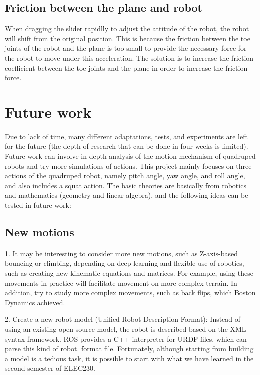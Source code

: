 \subsection{Friction between the plane and robot}

When dragging the slider rapidlly to adjust the attitude of the robot, the robot will shift from the original position. This is because the friction between the toe joints of the robot and the plane is too small to provide the necessary force for the robot to move under this acceleration. The solution is to increase the friction coefficient between the toe joints and the plane in order to increase the friction force.


\section{Future work}

Due to lack of time, many different adaptations, tests, and experiments are left for the future (the depth of research that can be done in four weeks is limited). Future work can involve in-depth analysis of
the motion mechanism of quadruped robots and try more simulations of actions.
This project mainly focuses on three actions of the quadruped robot, namely pitch angle, yaw angle, and roll angle, and also includes a squat action. The basic theories are basically from robotics and mathematics (geometry and linear algebra), and the following ideas can be tested in future work:

\subsection{New motions}

1. It may be interesting to consider more new motions, such as Z-axis-based bouncing or climbing, depending on deep learning and flexible use of robotics, such as creating new kinematic equations and matrices. For example, using these movements in practice will facilitate movement on more complex terrain. In addition, try to study more complex movements, such as back flips, which Boston Dynamics achieved.

2. Create a new robot model (Unified Robot Description Format): Instead of using an existing open-source model, the robot is described based on the XML syntax framework. ROS provides a C++ interpreter for URDF files, which can parse this kind of robot. format file. Fortunately, although starting from building a model is a tedious task, it is possible to start with what we have learned in the second semester of ELEC230.

